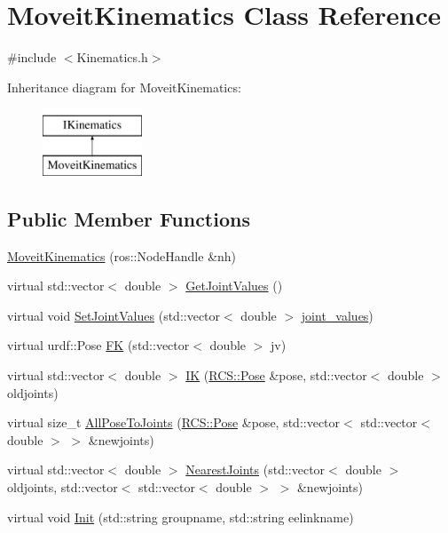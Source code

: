 \hypertarget{classMoveitKinematics}{\section{Moveit\-Kinematics Class Reference}
\label{classMoveitKinematics}
}


{\ttfamily \#include $<$Kinematics.\-h$>$}

Inheritance diagram for Moveit\-Kinematics\-:\begin{figure}[H]
\begin{center}
\leavevmode
\includegraphics[height=2.000000cm]{classMoveitKinematics}
\end{center}
\end{figure}
\subsection*{Public Member Functions}
\begin{DoxyCompactItemize}
\item 
\hyperlink{classMoveitKinematics_aff96ca668755f869ba25a4a775e15eac}{Moveit\-Kinematics} (ros\-::\-Node\-Handle \&nh)
\item 
virtual std\-::vector$<$ double $>$ \hyperlink{classMoveitKinematics_a8f186684d000616a6ff805fa0f41151e}{Get\-Joint\-Values} ()
\item 
virtual void \hyperlink{classMoveitKinematics_aee274ed4deddecb36191f8711c4b7c2e}{Set\-Joint\-Values} (std\-::vector$<$ double $>$ \hyperlink{classMoveitKinematics_a0ae2d3b65c1855ec6d6f094d1cd267f7}{joint\-\_\-values})
\item 
virtual urdf\-::\-Pose \hyperlink{classMoveitKinematics_a530fd2f88c75df40248a24c55081e1eb}{F\-K} (std\-::vector$<$ double $>$ jv)
\item 
virtual std\-::vector$<$ double $>$ \hyperlink{classMoveitKinematics_a70fa6e222157b71b6bf8fa7ed33075cc}{I\-K} (\hyperlink{namespaceRCS_aac02c0fd845140ea93a2a9254b1db6f6}{R\-C\-S\-::\-Pose} \&pose, std\-::vector$<$ double $>$ oldjoints)
\item 
virtual size\-\_\-t \hyperlink{classMoveitKinematics_a256bfc139809c215c34112a38938a372}{All\-Pose\-To\-Joints} (\hyperlink{namespaceRCS_aac02c0fd845140ea93a2a9254b1db6f6}{R\-C\-S\-::\-Pose} \&pose, std\-::vector$<$ std\-::vector$<$ double $>$ $>$ \&newjoints)
\item 
virtual std\-::vector$<$ double $>$ \hyperlink{classMoveitKinematics_acd060eacf93c71b0cfb61bd5c93ceb77}{Nearest\-Joints} (std\-::vector$<$ double $>$ oldjoints, std\-::vector$<$ std\-::vector$<$ double $>$ $>$ \&newjoints)
\item 
virtual void \hyperlink{classMoveitKinematics_a3d0a3d9eadca26b5a24dd9904fee6e91}{Init} (std\-::string groupname, std\-::string eelinkname)
\end{DoxyCompactItemize}

